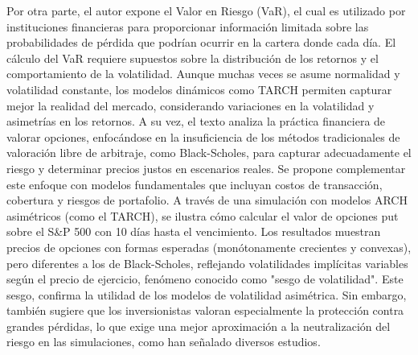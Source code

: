 \documentclass{article}
\theoremstyle{remark}
\theoremstyle{definition}
\begin{document}
\begin{enumerate}[label = \emph{\alph*})]
\begin{tcolorbox}[title=Soluci\'on 1.a]
            Por otra parte, el autor expone el Valor en Riesgo (VaR), el cual es utilizado por instituciones financieras para proporcionar información limitada sobre las probabilidades de pérdida que podrían ocurrir en la cartera donde cada día. El cálculo del VaR requiere supuestos sobre la distribución de los retornos y el comportamiento de la volatilidad. Aunque muchas veces se asume normalidad y volatilidad constante, los modelos dinámicos como TARCH permiten capturar mejor la realidad del mercado, considerando variaciones en la volatilidad y asimetrías en los retornos. A su vez, el texto analiza la práctica financiera de valorar opciones, enfocándose en la insuficiencia de los métodos tradicionales de valoración libre de arbitraje, como Black-Scholes, para capturar adecuadamente el riesgo y determinar precios justos en escenarios reales. Se propone complementar este enfoque con modelos fundamentales que incluyan costos de transacción, cobertura y riesgos de portafolio. A través de una simulación con modelos ARCH asimétricos (como el TARCH), se ilustra cómo calcular el valor de opciones put sobre el S\&P 500 con 10 días hasta el vencimiento. Los resultados muestran precios de opciones con formas esperadas (monótonamente crecientes y convexas), pero diferentes a los de Black-Scholes, reflejando volatilidades implícitas variables según el precio de ejercicio, fenómeno conocido como "sesgo de volatilidad". Este sesgo, confirma la utilidad de los modelos de volatilidad asimétrica. Sin embargo, también sugiere que los inversionistas valoran especialmente la protección contra grandes pérdidas, lo que exige una mejor aproximación a la neutralización del riesgo en las simulaciones, como han señalado diversos estudios. 


\end{tcolorbox}
\end{enumerate}
\end{document}
